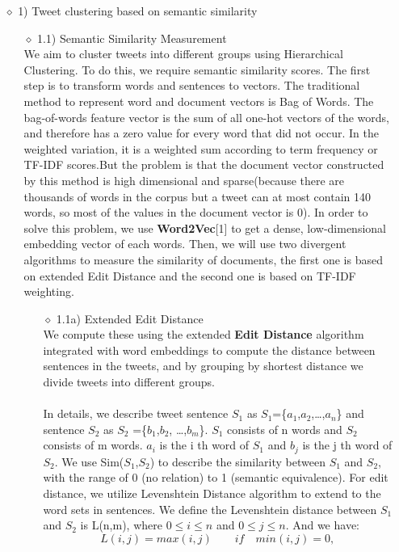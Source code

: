 \documentclass[10pt]{article}
\begin{document}
\begin{itemize}
\begin{itemize}
\item[$\diamond$]{1) Tweet clustering based on semantic similarity}
\begin{itemize}
\item[$\diamond$]{1.1) Semantic Similarity Measurement}\\
We aim to cluster tweets into different groups using Hierarchical Clustering. To do this, we require semantic similarity scores. The first step is to transform words and sentences to vectors. The traditional method to represent word and document vectors is Bag of Words. The bag-of-words feature vector is the sum of all one-hot vectors of the words, and therefore has a zero value for every word that  did not occur. In the weighted variation, it is a weighted sum according to term frequency or TF-IDF scores.But the problem is that the document vector constructed by this method is high dimensional and sparse(because there are thousands of words in the corpus but a tweet can at most contain 140 words, so most of the values in the document vector is 0). In order to solve this problem, we use  {\bf Word2Vec}[1] to get a dense, low-dimensional embedding vector of each words. Then, we will use two divergent algorithms to measure the similarity of documents, the first one is based on extended  Edit Distance and the second one is based on TF-IDF weighting.\\
\begin{itemize}
\item[$\diamond$]{1.1a) Extended Edit Distance}\\
We compute these using the extended {\bf Edit Distance} algorithm integrated with word embeddings to compute the distance between sentences in the tweets, and by grouping by shortest distance we divide tweets into different groups. \\\\
In details, we describe tweet sentence $S_1$ as $S_1$=\{$a_1$,$a_2$,…,$a_n$\} and sentence $S_2$ as $S_2$ =\{$b_1$,$b_2$, …,$b_m$\}. $S_1$ consists of n words and $S_2$ consists of m words. $a_i$ is the i th word of $S_1$ and $b_j$ is the j th word of $S_2$. We use Sim($S_1$,$S_2$) to describe the similarity between $S_1$ and $S_2$, with the range of 0 (no relation) to 1 (semantic equivalence). For edit distance, we utilize Levenshtein Distance algorithm to extend to the word sets in sentences. We define the Levenshtein distance between $S_1$ and $S_2$ is L(n,m), where  \(0\leq i\leq n\) and \(0\leq j\leq n\). And we have: \[L(i, j) = max(i, j)  \qquad   if \quad min(i,j)=0, \]  


\end{itemize}
\end{itemize}
\end{itemize}
\end{itemize}
\end{document}
